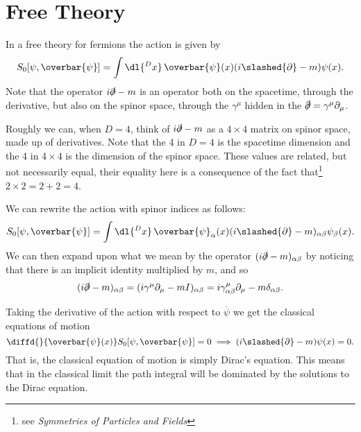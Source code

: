 \documentclass[fleqn]{NotesClass}
\newcommand*{\course}[1]{\textit{#1}}
\newcommand{\diracadjoint}[1]{\overbar{#1}}
\begin{document}
    \section{Free Theory}
    In a free theory for fermions the action is given by
    \begin{equation}
        S_0[\psi, \diracadjoint{\psi}] = \int \dl{^Dx} \, \diracadjoint{\psi}(x) (i\slashed{\partial} - m)\psi(x).
    \end{equation}
    Note that the operator \(i\slashed{\partial} - m\) is an operator both on the spacetime, through the derivative, but also on the spinor space, through the \(\gamma^\mu\) hidden in the \(\slashed{\partial} = \gamma^\mu \partial_\mu\).
    
    Roughly we can, when \(D = 4\), think of \(i\slashed{\partial} - m\) as a \(4 \times 4\) matrix on spinor space, made up of derivatives.
    Note that the 4 in \(D = 4\) is the spacetime dimension and the 4 in \(4 \times 4\) is the dimension of the spinor space.
    These values are related, but not necessarily equal, their equality here is a consequence of the fact that\footnote{see \course{Symmetries of Particles and Fields}} \(2 \times 2 = 2 + 2 = 4\).
    
    We can rewrite the action with spinor indices as follows:
    \begin{equation}
        S_0[\psi, \diracadjoint{\psi}] = \int \dl{^Dx} \, \diracadjoint{\psi}_\alpha(x) (i\slashed{\partial} - m)_{\alpha\beta} \psi_\beta(x).
    \end{equation}
    We can then expand upon what we mean by the operator \((i\slashed{\partial} - m)_{\alpha\beta}\) by noticing that there is an implicit identity multiplied by \(m\), and so
    \begin{equation}
        (i\slashed{\partial} - m)_{\alpha\beta} = (i\gamma^\mu\partial_\mu - mI)_{\alpha\beta} = i\gamma^\mu_{\alpha\beta}\partial_\mu - m\delta_{\alpha\beta}.
    \end{equation}
    
    Taking the derivative of the action with respect to \(\diracadjoint{\psi}\) we get the classical equations of motion
    \begin{equation}
        \diffd{}{\diracadjoint{\psi}(x)} S_0[\psi, \diracadjoint{\psi}] = 0 \implies (i\slashed{\partial} - m)\psi(x) = 0.
    \end{equation}
    That is, the classical equation of motion is simply Dirac's equation.
    This means that in the classical limit the path integral will be dominated by the solutions to the Dirac equation.
    
\end{document}
